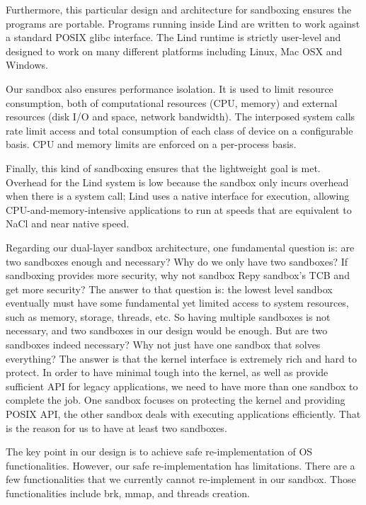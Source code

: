 \par
Furthermore, this particular design and architecture for sandboxing ensures the programs are portable. Programs running inside Lind are written to work against a standard POSIX glibc interface. The Lind runtime is strictly user-level and designed to work on many different platforms including Linux, Mac OSX and Windows.


\par
Our sandbox also ensures performance isolation. It is used to limit resource consumption, both of computational resources (CPU, memory) and external resources (disk I/O and space, network bandwidth). The interposed system calls rate limit access and total consumption of each class of device on a configurable basis. CPU and memory limits are enforced on a per-process basis. 


\par
Finally, this kind of sandboxing ensures that the lightweight goal is met. Overhead for the Lind system is low because the sandbox only incurs overhead when there is a system call; Lind uses a native interface for execution, allowing CPU-and-memory-intensive applications to run at speeds that are equivalent to NaCl and near native speed. 


\par
Regarding our dual-layer sandbox architecture, one fundamental question is: are two sandboxes enough and necessary? Why do we only have two sandboxes? If sandboxing provides more security, why not sandbox Repy sandbox's TCB and get more security? The answer to that question is: the lowest level sandbox eventually must have some fundamental yet limited access to system resources, such as memory, storage, threads, etc. So having multiple sandboxes is not necessary, and two sandboxes in our design would be enough. But are two sandboxes indeed necessary? Why not just have one sandbox that solves everything? The answer is that the kernel interface is extremely rich and hard to protect. In order to have minimal tough into the kernel, as well as provide sufficient API for legacy applications, we need to have more than one sandbox to complete the job. One sandbox focuses on protecting the kernel and providing POSIX API, the other sandbox deals with executing applications efficiently. That is the reason for us to have at least two sandboxes.  


\par 
The key point in our design is to achieve safe re-implementation of OS functionalities. However, our safe re-implementation has limitations. There are a few functionalities that we currently cannot re-implement in our sandbox. Those functionalities include brk, mmap, and threads creation.
